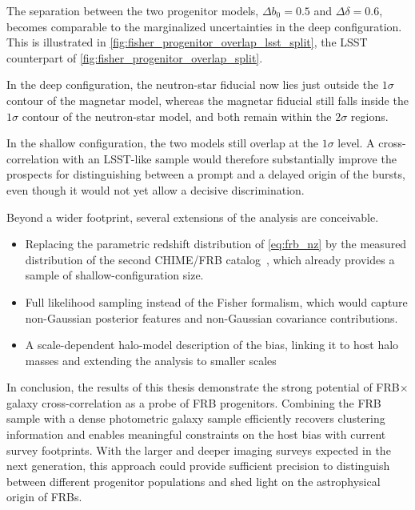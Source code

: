 The separation between the two progenitor models, $\Delta b_0 = 0.5$ and
$\Delta\delta = 0.6$, becomes comparable to the marginalized uncertainties in the deep
configuration. This is illustrated in \autoref{fig:fisher_progenitor_overlap_lsst_split}, the LSST
counterpart of \autoref{fig:fisher_progenitor_overlap_split}. 

In the deep configuration, the
neutron-star fiducial now lies just outside the $1\sigma$ contour of the magnetar model, whereas the
magnetar fiducial still falls inside the $1\sigma$ contour of the neutron-star model, and both remain
within the $2\sigma$ regions. 

In the shallow configuration, the two models still overlap at the
$1\sigma$ level. A cross-correlation with an LSST-like sample would therefore substantially improve
the prospects for distinguishing between a prompt and a delayed origin of the bursts, even though it would
not yet allow a decisive discrimination.

Beyond a wider footprint, several extensions of the analysis are conceivable.

\begin{itemize}
    \item Replacing the parametric redshift distribution of \autoref{eq:frb_nz} by the measured
    distribution of the second CHIME/FRB catalog~\cite{CHIMEFRB2026}, which already provides
    a sample of shallow-configuration size.
    \item Full likelihood sampling instead of the Fisher formalism, which would capture
    non-Gaussian posterior features and non-Gaussian covariance contributions.
    \item A scale-dependent halo-model description of the bias, linking it to host halo masses
    and extending the analysis to smaller scales
\end{itemize}

In conclusion, the results of this thesis demonstrate the strong 
potential of FRB$\times$galaxy cross-correlation as a probe of FRB progenitors. 
Combining the FRB sample with a dense photometric galaxy sample efficiently 
recovers clustering information and enables meaningful constraints on the host bias with current survey footprints. 
With the larger and deeper imaging 
surveys expected in the next generation, this approach could provide sufficient 
precision to distinguish between different progenitor populations and shed light 
on the astrophysical origin of FRBs.